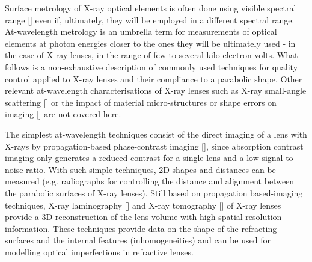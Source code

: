 \begin{refsection}
Surface metrology of X-ray optical elements is often done using visible spectral range [\cite{Alcock2016, Vivo2019}] even if, ultimately, they will be employed in a different spectral range. At-wavelength metrology is an umbrella term for measurements of optical elements at photon energies closer to the ones they will be ultimately used - in the case of X-ray lenses, in the range of few to several kilo-electron-volts. What follows is a non-exhaustive description of commonly used techniques for quality control applied to X-ray lenses and their compliance to a parabolic shape. Other relevant at-wavelength characterisations of X-ray lenses such as X-ray small-angle scattering [\cite{Roth2014, Chubar2020}] or the impact of material micro-structures or shape errors on imaging [\cite{Chubar2020,Lyatun2020}] are not covered here. 

The simplest at-wavelength techniques consist of the direct imaging of a lens with X-rays by propagation-based phase-contrast imaging [\cite{Endrizzi2018}], since absorption contrast imaging only generates a reduced contrast for a single lens and a low signal to noise ratio. With such simple techniques, 2D shapes and distances can be measured (e.g. radiographs for controlling the distance and alignment between the parabolic surfaces of X-ray lenses). Still based on propagation based-imaging techniques, X-ray laminography [\cite{Helfen2011,Roth2014}] and X-ray tomography [\cite{Landis2010,Narikovich2017}] of X-ray lenses provide a 3D reconstruction of the lens volume with high spatial resolution information. These techniques provide data on the shape of the refracting surfaces and the internal features (inhomogeneities) and can be used for modelling optical imperfections in refractive lenses. 



\end{refsection}
